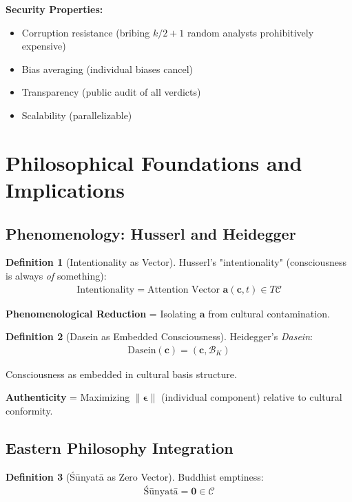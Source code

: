 \documentclass[11pt,a4paper]{article}
\theoremstyle{definition}
\newtheorem{definition}{Definition}[section]
\theoremstyle{remark}
\newcommand{\CC}{\mathcal{C}}
\newcommand{\cc}{\mathbf{c}}
\begin{document}
\begin{small}
\textbf{Security Properties:}
\begin{itemize}
\item Corruption resistance (bribing $k/2 + 1$ random analysts prohibitively expensive)
\item Bias averaging (individual biases cancel)
\item Transparency (public audit of all verdicts)
\item Scalability (parallelizable)
\end{itemize}

\section{Philosophical Foundations and Implications}

\subsection{Phenomenology: Husserl and Heidegger}

\begin{definition}[Intentionality as Vector]
Husserl's "intentionality" (consciousness is always \textit{of} something):
\begin{align}
\text{Intentionality} = \text{Attention Vector } \mathbf{a}(\cc, t) \in T\CC
\end{align}

\textbf{Phenomenological Reduction} = Isolating $\mathbf{a}$ from cultural contamination.
\end{definition}

\begin{definition}[Dasein as Embedded Consciousness]
Heidegger's \textit{Dasein}:
\begin{align}
\text{Dasein}(\cc) = \left(\cc, \mathcal{B}_K\right)
\end{align}

Consciousness as embedded in cultural basis structure.

\textbf{Authenticity} = Maximizing $\|\boldsymbol{\epsilon}\|$ (individual component) relative to cultural conformity.
\end{definition}

\subsection{Eastern Philosophy Integration}

\begin{definition}[Śūnyatā as Zero Vector]
Buddhist emptiness:
\begin{align}
\text{Śūnyatā} = \mathbf{0} \in \CC
\end{align}


\end{definition}
\end{small}
\end{document}
